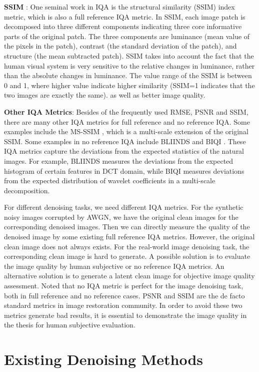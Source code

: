 \textbf{SSIM} \cite{ssim}: One seminal work in IQA is the structural similarity (SSIM) index metric, which is also a full reference IQA metric. In SSIM, each image patch is decomposed into three different components indicating three core informative parts of the original patch. The three components are luminance (mean value of the pixels in the patch), contrast (the standard deviation of the patch), and structure (the mean subtracted patch). SSIM takes into account the fact that the human visual system is very sensitive to the relative changes in luminance, rather than the absolute changes in luminance. The value range of the SSIM is between 0 and 1, where higher value indicate higher similarity (SSIM=1 indicates that the two images are exactly the same). as well as better image quality. 

\textbf{Other IQA Metrics}: Besides of the frequently used RMSE, PSNR and SSIM, there are many other IQA metrics for full reference and no reference IQA. Some examples include the MS-SSIM \cite{msssim}, which is a multi-scale extension of the original SSIM. Some examples in no reference IQA include BLIINDS \cite{bliinds} and BIQI \cite{biqi}. These IQA metrics capture the deviations from the expected statistics of the natural images. For example, BLIINDS measures the deviations from the expected histogram of certain features in DCT domain, while BIQI measures deviations from the expected distribution of wavelet coefficients in a multi-scale decomposition.

For different denoising tasks, we need different IQA metrics. For the synthetic noisy images corrupted by AWGN, we have the original clean images for the corresponding denoised images. Then we can directly measure the quality of the denoised image by some existing full reference IQA metrics. However, the original clean image does not always exists. For the real-world image denoising task, the corresponding clean image is hard to generate. A possible solution is to evaluate the image quality by human subjective or no reference IQA metrics. An alternative solution is to generate a latent clean image for objective image quality assessment. Noted that no IQA metric is perfect for the image denoising task, both in full reference and no reference cases. PSNR and SSIM are the de facto standard metrics in image restoration community. In order to avoid these two metrics generate bad results, it is essential to demonstrate the image quality in the thesis for human subjective evaluation.


\section{Existing Denoising Methods}

